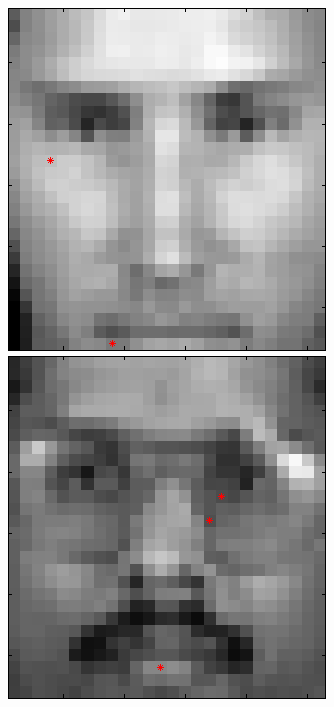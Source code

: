 \begin{figure}[ht]
 \includegraphics[width=\textwidth*11/100]{ch5/figures/XM2VTS_2_0.png}
 \includegraphics[width=\textwidth*11/100]{ch5/figures/XM2VTS_3_0.png}

\end{figure}
